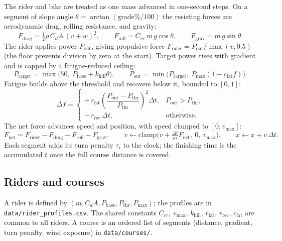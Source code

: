 \documentclass[11pt]{article}
\begin{document}
The rider and bike are treated as one mass advanced in one-second steps. On a segment of slope angle $\theta = \arctan(\mathrm{grade}\%/100)$ the resisting forces are aerodynamic drag, rolling resistance, and gravity:
\begin{equation}
F_\mathrm{drag} = \tfrac12 \rho\, C_dA\, (v + w)^2, \qquad
F_\mathrm{roll} = C_{rr}\, m\, g \cos\theta, \qquad
F_\mathrm{grav} = m\, g \sin\theta .
\end{equation}
The rider applies power $P_\mathrm{out}$, giving propulsive force $F_\mathrm{rider} = P_\mathrm{out} / \max(v, 0.5)$ (the floor prevents division by zero at the start). Target power rises with gradient and is capped by a fatigue-reduced ceiling:
\begin{equation}
P_\mathrm{target} = \max\!\big(50,\ P_\mathrm{base} + k_\mathrm{hill}\theta\big), \qquad
P_\mathrm{out} = \min\!\big(P_\mathrm{target},\ P_\mathrm{max}(1 - c_\mathrm{fat} f)\big).
\end{equation}
Fatigue builds above the threshold and recovers below it, bounded to $[0,1]$:
\begin{equation}
\Delta f =
\begin{cases}
+\, r_\mathrm{fat}\left(\dfrac{P_\mathrm{out} - P_\mathrm{thr}}{P_\mathrm{thr}}\right)^2 \Delta t, & P_\mathrm{out} > P_\mathrm{thr}, \\[2mm]
-\, r_\mathrm{rec}\, \Delta t, & \text{otherwise.}
\end{cases}
\end{equation}
The net force advances speed and position, with speed clamped to $[0, v_\mathrm{max}]$:
\begin{equation}
F_\mathrm{net} = F_\mathrm{rider} - F_\mathrm{drag} - F_\mathrm{roll} - F_\mathrm{grav}, \qquad
v \leftarrow \mathrm{clamp}\!\Big(v + \tfrac{\Delta t}{m} F_\mathrm{net},\ 0,\ v_\mathrm{max}\Big), \qquad
x \leftarrow x + v\, \Delta t .
\end{equation}
Each segment adds its turn penalty $\tau_i$ to the clock; the finishing time is the accumulated $t$ once the full course distance is covered.

\subsection{Riders and courses}
A rider is defined by $(m, C_dA, P_\mathrm{base}, P_\mathrm{thr}, P_\mathrm{max})$; the profiles are in \texttt{data/rider\_profiles.csv}. The shared constants $C_{rr}$, $v_\mathrm{max}$, $k_\mathrm{hill}$, $r_\mathrm{fat}$, $r_\mathrm{rec}$, $c_\mathrm{fat}$ are common to all riders. A course is an ordered list of segments (distance, gradient, turn penalty, wind exposure) in \texttt{data/courses/}.
\end{document}
